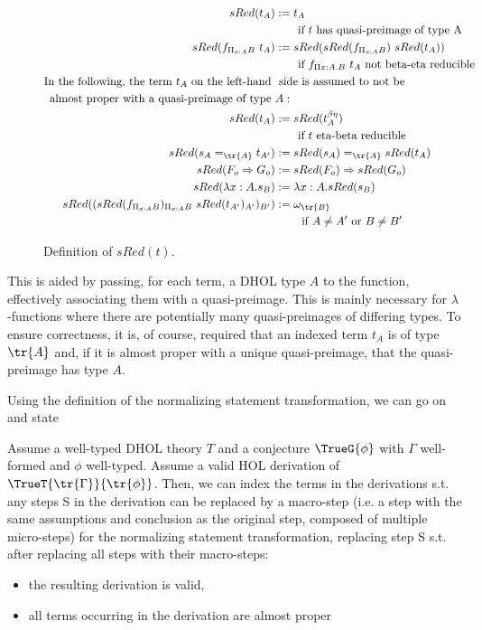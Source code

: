 \begin{figure}[t]
  \centering
  \begin{align*}
    sRed(t_A) &:= t_A \\
    & \qquad \text{if } t \text{ has quasi-preimage of type A} \\
    sRed(f_{\Pi_{x:A}B}\ t_A) &:= sRed(sRed(f_{\Pi_{x:A}B})\ sRed(t_A)) \\
    & \qquad \text{if } f_{\Pi x:A.B}\ t_A \text{ not beta-eta reducible} \\
    \text{In the following, the term } t_A \text{ on the left-hand } & \text{ side is assumed to not be} &&\\
    \text{ almost proper with a quasi-preimage of type } &A:\\
    sRed(t_A) &:= sRed(t_A^{\beta\eta}) \\
    & \qquad \text{if } t \text{ eta-beta reducible} \\
    sRed(s_A =_{\tr{A}} t_{A'}) &:= sRed(s_A) =_{\tr{A}} sRed(t_A) \\
    sRed(F_o \Rightarrow G_o) &:= sRed(F_o) \Rightarrow sRed(G_o) \\
    sRed(\lambda x:A.s_B) &:= \lambda x:A.sRed(s_B) \\
    sRed((sRed(f_{\Pi_{x:A}B})_{\Pi_{x:A}B}\ sRed(t_{A'})_{A'})_{B'}) &:= \omega_{\tr{B}} \\
    & \qquad \text{ if } A \neq A' \text{ or } B \neq B'
  \end{align*}
  \caption{Definition of \(sRed(t)\).}
  \label{fig:sRed}
\end{figure}

This is aided by passing, for each term, a DHOL type \(A\) to the function, effectively associating them with a
quasi-preimage. This is mainly necessary for \(\lambda\)-functions where there are potentially
many quasi-preimages of differing types. To ensure correctness, it is, of course, required that an
indexed term \(t_A\) is of type \(\tr{A}\) and, if it is almost proper with a unique
quasi-preimage, that the quasi-preimage has type \(A\). 

Using the definition of the normalizing statement transformation, we can go on and state
\begin{lemma}
  \label{lem:sRed}
Assume a well-typed DHOL theory \(T\) and a conjecture \(\TrueG{\phi}\) with \(\Gamma\)
well-formed and \(\phi\) well-typed. Assume a valid HOL derivation of \(\TrueT{\tr{\Gamma}}
{\tr{\phi}}\). Then, we can index the terms in the derivations s.t. any steps S
in the derivation can be replaced by a macro-step (i.e. a step with the same assumptions and conclusion as the original step, composed of multiple micro-steps) for the normalizing statement transformation,
replacing step S s.t. after replacing all steps with their macro-steps:
\begin{itemize}
\item the resulting derivation is valid,
\item all terms occurring in the derivation are almost proper
\end{itemize}
\end{lemma}

